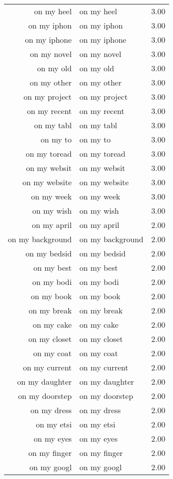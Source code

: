 \begin{table}[ht]
\begin{tabular}{rlr}
  on my heel & on my heel & 3.00 \\ 
  on my iphon & on my iphon & 3.00 \\ 
  on my iphone & on my iphone & 3.00 \\ 
  on my novel & on my novel & 3.00 \\ 
  on my old & on my old & 3.00 \\ 
  on my other & on my other & 3.00 \\ 
  on my project & on my project & 3.00 \\ 
  on my recent & on my recent & 3.00 \\ 
  on my tabl & on my tabl & 3.00 \\ 
  on my to & on my to & 3.00 \\ 
  on my toread & on my toread & 3.00 \\ 
  on my websit & on my websit & 3.00 \\ 
  on my website & on my website & 3.00 \\ 
  on my week & on my week & 3.00 \\ 
  on my wish & on my wish & 3.00 \\ 
  on my april & on my april & 2.00 \\ 
  on my background & on my background & 2.00 \\ 
  on my bedsid & on my bedsid & 2.00 \\ 
  on my best & on my best & 2.00 \\ 
  on my bodi & on my bodi & 2.00 \\ 
  on my book & on my book & 2.00 \\ 
  on my break & on my break & 2.00 \\ 
  on my cake & on my cake & 2.00 \\ 
  on my closet & on my closet & 2.00 \\ 
  on my coat & on my coat & 2.00 \\ 
  on my current & on my current & 2.00 \\ 
  on my daughter & on my daughter & 2.00 \\ 
  on my doorstep & on my doorstep & 2.00 \\ 
  on my dress & on my dress & 2.00 \\ 
  on my etsi & on my etsi & 2.00 \\ 
  on my eyes & on my eyes & 2.00 \\ 
  on my finger & on my finger & 2.00 \\ 
  on my googl & on my googl & 2.00 \\ 

\end{tabular}
\end{table}

